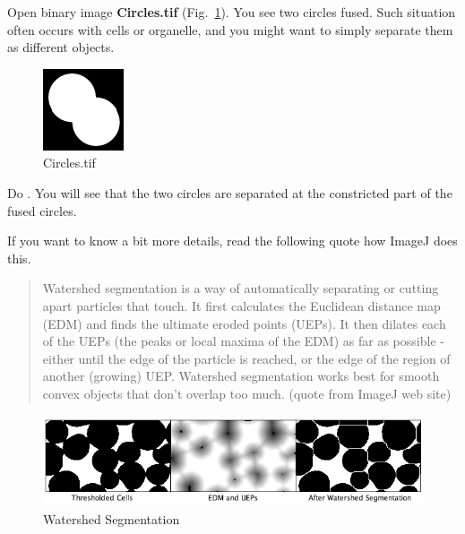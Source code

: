\begin{indentexercise}{1}
Open binary image \textbf{Circles.tif} (Fig.~\ref{fig:img116}). You
see two circles fused. Such situation often occurs with cells or
organelle, and you might want to simply separate them as different
objects. 

\begin{figure}[htbp]
\begin{center}
\includegraphics[width=2.381cm,height=2.408cm]{fig/CMCIBasicCourse201102-img116.png}
\caption{ Circles.tif}
\label{fig:img116}
\end{center}
\end{figure}

Do . You will see that the two circles are separated at the
constricted part of the fused circles. 
\end{indentexercise}

If you want to know a bit more details, read the following quote how ImageJ does this.
\begin{quote}
Watershed segmentation is a way of automatically separating or cutting
apart particles that touch. It first calculates the Euclidean distance
map (EDM) and finds the ultimate eroded points (UEPs). It then dilates
each of the UEPs (the peaks or local maxima of the EDM) as far as
possible - either until the edge of the particle is reached, or the
edge of the region of another (growing) UEP. Watershed segmentation
works best for smooth convex objects that don't
overlap too much. (quote from ImageJ web site) 
\end{quote}
\begin{figure}[htbp]
\begin{center}
\includegraphics[width=13.418cm,height=2.701cm]{fig/CMCIBasicCourse201102-img117.png}
\caption{ Watershed Segmentation}
\label{fig:img117}
\end{center}
\end{figure}

